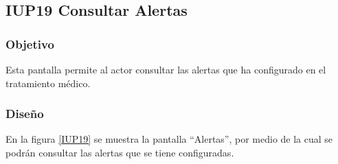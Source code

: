 \subsection{IUP19 Consultar Alertas}
 
\subsubsection{Objetivo}

    Esta pantalla permite al actor consultar las alertas que ha configurado en el tratamiento médico.

\subsubsection{Diseño}

    En la figura \ref{IUP19} se muestra la pantalla ``Alertas'', por medio de la cual se podrán consultar las alertas que se tiene configuradas. \\
\newpage

%
%
